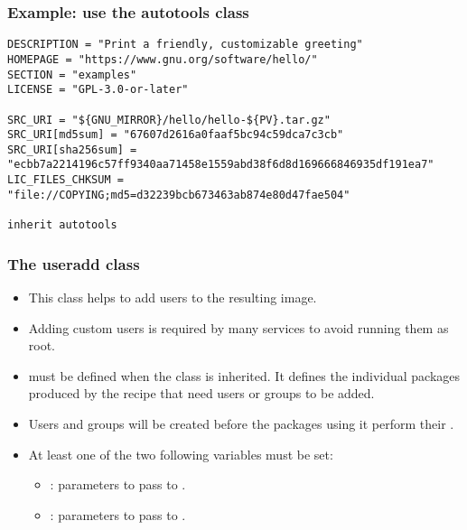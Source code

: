 \begin{frame}[fragile]
  \frametitle{Example: use the autotools class}
  \begin{block}{}
    \begin{verbatim}
DESCRIPTION = "Print a friendly, customizable greeting"
HOMEPAGE = "https://www.gnu.org/software/hello/"
SECTION = "examples"
LICENSE = "GPL-3.0-or-later"

SRC_URI = "${GNU_MIRROR}/hello/hello-${PV}.tar.gz"
SRC_URI[md5sum] = "67607d2616a0faaf5bc94c59dca7c3cb"
SRC_URI[sha256sum] = "ecbb7a2214196c57ff9340aa71458e1559abd38f6d8d169666846935df191ea7"
LIC_FILES_CHKSUM = "file://COPYING;md5=d32239bcb673463ab874e80d47fae504"

inherit autotools
    \end{verbatim}
  \end{block}
\end{frame}

\begin{frame}
  \frametitle{The useradd class}
  \begin{itemize}
    \item This class helps to add users to the resulting image.
    \item Adding custom users is required by many services to avoid
          running them as root.
    \item {} must be defined when the  class
          is inherited. It defines the individual packages produced by the
          recipe that need users or groups to be added.
    \item Users and groups will be created before the packages using
          it perform their .
    \item At least one of the two following variables must be set:
    \begin{itemize}
      \item {}: parameters to pass to
            .
      \item {}: parameters to pass to
            .
    \end{itemize}
  \end{itemize}
\end{frame}

